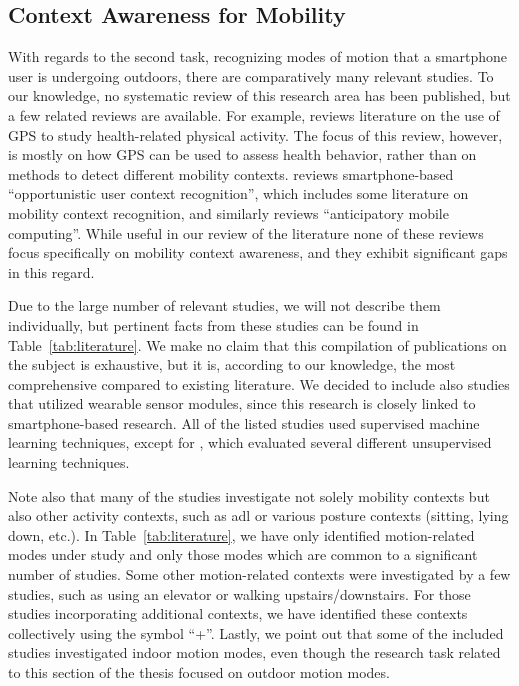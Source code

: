 \subsection{Context Awareness for Mobility}
\label{sec:mobility-context-literature}

With regards to the second task, recognizing modes of motion that a smartphone user is undergoing outdoors, there are comparatively many relevant studies. To our knowledge, no systematic review of this research area has been published, but a few related reviews are available. For example, \cite{Duncan2009} reviews literature on the use of GPS to study health-related physical activity. The focus of this review, however, is mostly on how GPS can be used to assess health behavior, rather than on methods to detect different mobility contexts.  \cite{hoseini2013survey} reviews smartphone-based ``opportunistic user context recognition'', which includes some literature on mobility context recognition, and similarly \cite{pejovic2015anticipatory} reviews ``anticipatory mobile computing''. While useful in our review of the literature none of these reviews focus specifically on mobility context awareness, and they exhibit significant gaps in this regard.

Due to the large number of relevant studies, we will not describe them individually, but pertinent facts from these studies can be found in Table~\ref{tab:literature}. We make no claim that this compilation of publications on the subject is exhaustive, but it is, according to our knowledge, the most comprehensive compared to existing literature. We decided to include also studies that utilized wearable sensor modules, since this research is closely linked to smartphone-based research. All of the listed studies used supervised machine learning techniques, except for \cite{kwon2014unsupervised}, which evaluated several different unsupervised learning techniques.

Note also that many of the studies investigate not solely mobility contexts but also other activity contexts, such as \gls{adl} or various posture contexts (sitting, lying down, etc.). In Table~\ref{tab:literature}, we have only identified motion-related modes under study and only those modes which are common to a significant number of studies. Some other motion-related contexts were investigated by a few studies, such as using an elevator or walking upstairs/downstairs. For those studies incorporating additional contexts, we have identified these contexts collectively using the symbol ``+''. Lastly, we point out that some of the included studies investigated indoor motion modes, even though the research task related to this section of the thesis focused on outdoor motion modes. 

